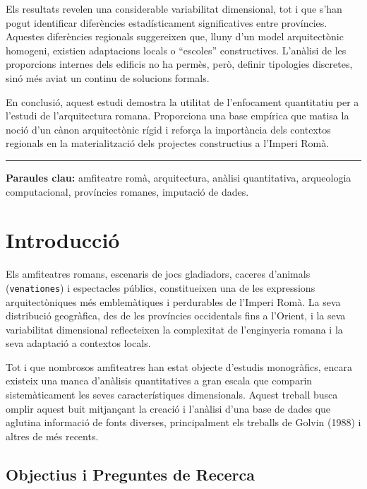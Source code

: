 \documentclass[
  12pt,
  letterpaper,
  DIV=11,
  numbers=noendperiod]{scrreprt}
\begin{document}
Els resultats revelen una considerable variabilitat dimensional, tot i
que s'han pogut identificar diferències estadísticament significatives
entre províncies. Aquestes diferències regionals suggereixen que, lluny
d'un model arquitectònic homogeni, existien adaptacions locals o
``escoles'' constructives. L'anàlisi de les proporcions internes dels
edificis no ha permès, però, definir tipologies discretes, sinó més
aviat un continu de solucions formals.

En conclusió, aquest estudi demostra la utilitat de l'enfocament
quantitatiu per a l'estudi de l'arquitectura romana. Proporciona una
base empírica que matisa la noció d'un cànon arquitectònic rígid i
reforça la importància dels contextos regionals en la materialització
dels projectes constructius a l'Imperi Romà.

\begin{center}\rule{0.5\linewidth}{0.5pt}\end{center}

\textbf{Paraules clau:} amfiteatre romà, arquitectura, anàlisi
quantitativa, arqueologia computacional, províncies romanes, imputació
de dades.


\chapter{Introducció}\label{introducciuxf3}

Els amfiteatres romans, escenaris de jocs gladiadors, caceres d'animals
(\texttt{venationes}) i espectacles públics, constitueixen una de les
expressions arquitectòniques més emblemàtiques i perdurables de l'Imperi
Romà. La seva distribució geogràfica, des de les províncies occidentals
fins a l'Orient, i la seva variabilitat dimensional reflecteixen la
complexitat de l'enginyeria romana i la seva adaptació a contextos
locals.

Tot i que nombrosos amfiteatres han estat objecte d'estudis monogràfics,
encara existeix una manca d'anàlisis quantitatives a gran escala que
comparin sistemàticament les seves característiques dimensionals. Aquest
treball busca omplir aquest buit mitjançant la creació i l'anàlisi d'una
base de dades que aglutina informació de fonts diverses, principalment
els treballs de Golvin (1988) i altres de més recents.

\section{Objectius i Preguntes de
Recerca}\label{objectius-i-preguntes-de-recerca}
\end{document}
